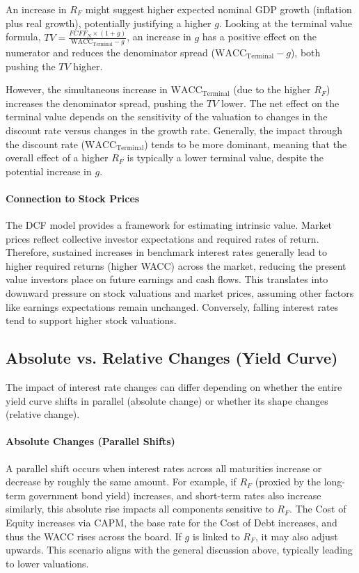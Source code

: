 An increase in \(R_F\) might suggest higher expected nominal GDP growth (inflation plus real growth), potentially justifying a higher \(g\). Looking at the terminal value formula, \(TV = \frac{FCFF_N \times (1+g)}{\text{WACC}_{\text{Terminal}} - g}\), an increase in \(g\) has a positive effect on the numerator and reduces the denominator spread (\(\text{WACC}_{\text{Terminal}} - g\)), both pushing the \(TV\) higher.

However, the simultaneous increase in \(\text{WACC}_{\text{Terminal}}\) (due to the higher \(R_F\)) increases the denominator spread, pushing the \(TV\) lower. The net effect on the terminal value depends on the sensitivity of the valuation to changes in the discount rate versus changes in the growth rate. Generally, the impact through the discount rate (\(\text{WACC}_{\text{Terminal}}\)) tends to be more dominant, meaning that the overall effect of a higher \(R_F\) is typically a lower terminal value, despite the potential increase in \(g\).

\paragraph{Connection to Stock Prices}
The DCF model provides a framework for estimating intrinsic value. Market prices reflect collective investor expectations and required rates of return. Therefore, sustained increases in benchmark interest rates generally lead to higher required returns (higher WACC) across the market, reducing the present value investors place on future earnings and cash flows. This translates into downward pressure on stock valuations and market prices, assuming other factors like earnings expectations remain unchanged. Conversely, falling interest rates tend to support higher stock valuations.

\subsection{Absolute vs. Relative Changes (Yield Curve)}

The impact of interest rate changes can differ depending on whether the entire yield curve shifts in parallel (absolute change) or whether its shape changes (relative change).

\paragraph{Absolute Changes (Parallel Shifts)}
A parallel shift occurs when interest rates across all maturities increase or decrease by roughly the same amount. For example, if \(R_F\) (proxied by the long-term government bond yield) increases, and short-term rates also increase similarly, this absolute rise impacts all components sensitive to \(R_F\). The Cost of Equity increases via CAPM, the base rate for the Cost of Debt increases, and thus the WACC rises across the board. If \(g\) is linked to \(R_F\), it may also adjust upwards. This scenario aligns with the general discussion above, typically leading to lower valuations.

